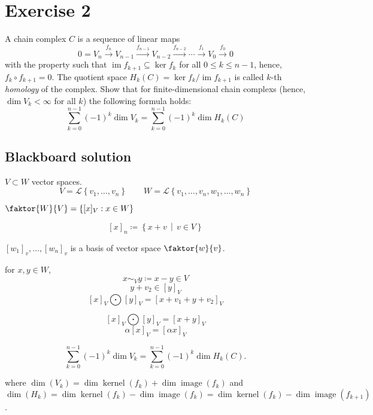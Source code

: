 \documentclass[a4paper]{article}
\theoremstyle{definition}
\DeclareMathOperator\kernel{kernel}
\DeclareMathOperator\image{image}
\newcommand\set[1]{\left\{#1\right\}}
\newcommand\setdef[2]{\left\{#1\,\middle|\,#2\right\}}
\begin{document}
\section*{Exercise 2}
\begin{ex}
  A chain complex $C$ is a sequence of linear maps
  \[ 0 = V_n \xrightarrow{f_n} V_{n-1} \xrightarrow{f_{n-1}} V_{n-2} \xrightarrow{f_{n-2}} \cdots \xrightarrow{f_1} V_0 \xrightarrow{f_0} 0 \]
  with the property such that $\operatorname{im}{f_{k+1}} \subseteq \operatorname{ker}{f_{k}}$ for all $0 \leq k \leq n-1$, hence,
  $f_k \circ f_{k+1} = 0$. The quotient space $H_k(C) = \operatorname{ker}{f_k} / \operatorname{im}{f_{k+1}}$ is called $k$-th \emph{homology}
  of the complex. Show that for finite-dimensional chain complexs (hence, $\dim{V_k} < \infty$ for all $k$) the following formula holds:
  \[ \sum_{k=0}^{n-1} (-1)^k \dim{V_k} = \sum_{k=0}^{n-1} (-1)^k \dim{H_k}(C) \]
\end{ex}

\subsection{Blackboard solution}

$V \subset W$ vector spaces.
\[ V = \mathcal L\set{v_1, \dots, v_n} \qquad W = \mathcal L\set{v_1, \dots, v_n, w_1, \dots, w_n} \]

$\faktor{W}{V} = \set{[x]_V: x \in W}$

\[ [x]_n \coloneqq \setdef{x+v}{v \in V} \]

$[w_1]_v, \dots, [w_n]_v$ is a basis of vector space $\faktor{w}{v}$.

for $x, y \in W$,
\[ x \sim_V y \coloneqq x - y \in V \]
\[ y + v_2 \in [y]_V \]
\[ [x]_V \bigodot [y]_V = [x + v_1 + y + v_2]_V \]

\[ [x]_V \bigodot [y]_V = [x+y]_V \]
\[ \alpha [x]_V = [\alpha x]_V \]


\[ \sum_{k=0}^{n-1} (-1)^k \dim{V_k} = \sum_{k=0}^{n-1} (-1)^k \dim{H_k(C)}. \]

where $\dim(V_k) = \dim\kernel(f_k) + \dim\image(f_k)$ and $\dim(H_k) = \dim\kernel(f_k) - \dim\image(f_k) = \dim\kernel(f_k) - \dim\image(f_{k+1})$.
\end{document}
